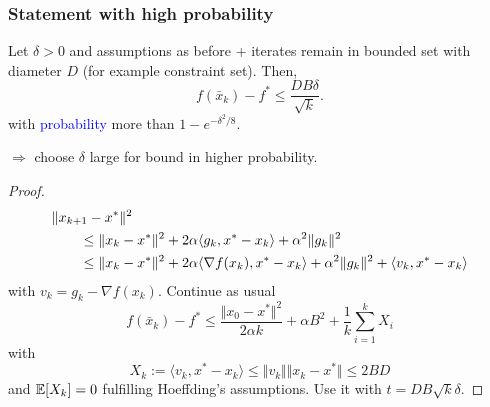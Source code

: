 \documentclass[aspectratio=149]{beamer}
\begin{document}
\begin{frame}
  \frametitle{Statement with high probability}
  \begin{theorem}
    Let $\delta>0$ and assumptions as before + iterates remain in bounded set with diameter $D$ (for example constraint set). Then,
    \begin{equation}
       f(\bar{x}_k) - f^* \le \frac{D B \delta}{\sqrt{k}}.
    \end{equation}
    with \textcolor{blue}{probability} more than $1-e^{-\delta^2/8}$.
  \end{theorem}
  $\Rightarrow$ choose $\delta$ large for bound in higher probability.
\end{frame}


\begin{frame}
  \begin{adjustwidth}{-1.5em}{-1.5em}
    \begin{minipage}{1.1\textwidth}
    \begin{proof}
      \begin{equation}
        \begin{aligned}
          \MoveEqLeft \Vert x_{k+1} - x^* \Vert^2 \\
          &\le \Vert x_k-x^* \Vert^2 + 2 \alpha \langle g_k, x^*-x_k \rangle + \alpha^2 \Vert g_k \Vert^2 \\
          &\le \Vert x_k-x^* \Vert^2 + 2 \alpha \langle \nabla f(x_k), x^*-x_k \rangle + \alpha^2 \Vert g_k \Vert^2  + \langle v_k, x^*-x_k \rangle\\
        \end{aligned}
      \end{equation}
      with $v_k = g_k -\nabla f(x_k)$.
      Continue as usual
      \begin{equation}
        f(\bar{x}_k) - f^* \le \frac{\Vert x_0-x^* \Vert^2}{2 \alpha k} + \alpha B^2 + \frac{1}{k} \sum_{i=1}^{k} X_i
      \end{equation}
      with
      \begin{equation}
        X_k := \langle v_k, x^*-x_k \rangle \le \Vert v_k \Vert \Vert x_k-x^* \Vert \le 2BD
      \end{equation}
      and $\mathbb{E}[X_k]=0$ fulfilling Hoeffding's assumptions. Use it with $t= DB \sqrt{k}\delta$.
    \end{proof}
    \end{minipage}
  \end{adjustwidth}
\end{frame}
\end{document}
